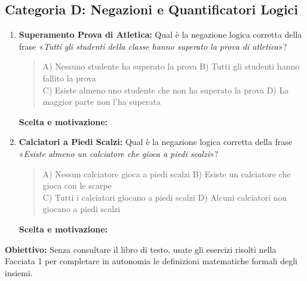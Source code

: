 \documentclass[11pt, a4paper]{article}
\begin{document}
\subsection*{Categoria D: Negazioni e Quantificatori Logici}
\begin{enumerate}[resume]
    \item \textbf{Superamento Prova di Atletica:} Qual è la negazione logica corretta della frase «\textit{Tutti gli studenti della classe hanno superato la prova di atletica}»?
    \begin{quote}
    A) Nessuno studente ha superato la prova \quad B) Tutti gli studenti hanno fallito la prova \\
    C) Esiste almeno uno studente che non ha superato la prova \quad D) La maggior parte non l'ha superata
    \end{quote}
    \textbf{Scelta e motivazione:} \dotfill

    \vspace{0.8cm}

    \item \textbf{Calciatori a Piedi Scalzi:} Qual è la negazione logica corretta della frase «\textit{Esiste almeno un calciatore che gioca a piedi scalzi}»?
    \begin{quote}
    A) Nessun calciatore gioca a piedi scalzi \quad B) Esiste un calciatore che gioca con le scarpe \\
    C) Tutti i calciatori giocano a piedi scalzi \quad D) Alcuni calciatori non giocano a piedi scalzi
    \end{quote}
    \textbf{Scelta e motivazione:} \dotfill
\end{enumerate}

\clearpage


\begin{tcolorbox}[colframe=secondary, title=\Large\bfseries PARTE 2: LABORATORIO DI FORMALIZZAZIONE (SQUADRA BETA)]
\textbf{Obiettivo:} Senza consultare il libro di testo, usate gli esercizi risolti nella Facciata 1 per completare in autonomia le definizioni matematiche formali degli insiemi.
\end{tcolorbox}

\vspace{-1mm}
\end{document}
